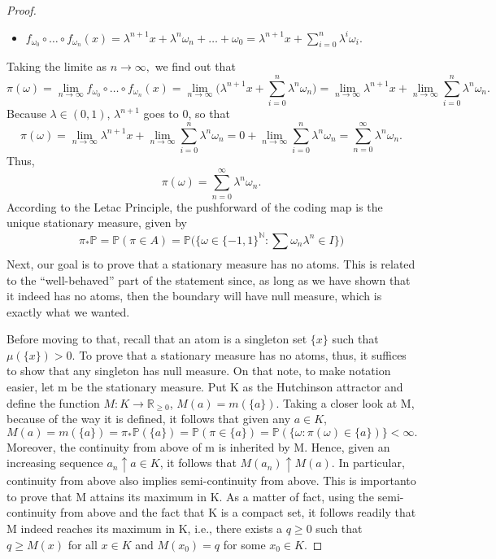 \documentclass[a4paper]{article}
\theoremstyle{plain}
\theoremstyle{definition}
\begin{document}
\begin{proof}
\begin{itemize}
  \item \(f_{\omega_{0}}\circ{\dotsc}\circ{f_{\omega_{n}}}(x) = \lambda^{n+1}x + \lambda^{n}\omega_{n} + \dotsc + \omega_{0} = \lambda^{n+1}x + \sum\limits_{i=0}^{n}\lambda^{i}\omega_{i}.\)
\end{itemize}
Taking the limite as \(n\rightarrow \infty,\) we find out that 
  \[
    \pi(\omega) = \lim_{n\to \infty}f_{\omega_{0}}\circ{\dotsc}\circ{f_{\omega_{n}}}(x) = \lim_{n\to \infty} \biggl(\lambda^{n+1}x + \sum\limits_{i=0}^{n}\lambda^{n}\omega_{n}\biggr) = \lim_{n\to \infty}\lambda^{n+1}x + \lim_{n\to \infty}\sum\limits_{i=0}^{n}\lambda^{n}\omega_{n}.
  \] 
Because \(\lambda\in(0, 1)\), \(\lambda^{n+1}\) goes to 0, so that 
  \[
    \pi(\omega) = \lim_{n\to \infty}\lambda^{n+1}x + \lim_{n\to \infty}\sum\limits_{i=0}^{n}\lambda^{n}\omega_{n} = 0 + \lim_{n\to \infty}\sum\limits_{i=0}^{n}\lambda^{n}\omega_{n} = \sum\limits_{n=0}^{\infty}\lambda^{n}\omega_{n}.
  \]
  Thus, 
  \[
    \pi (\omega ) = \sum\limits_{n=0}^{\infty}\lambda^{n}\omega_{n}.
  \]
  According to the Letac Principle, the pushforward of the coding map is the unique stationary measure, given by 
  \[
    \pi_{*}\mathbb{P} = \mathbb{P}(\pi \in A) = \mathbb{P}\biggl(\biggl\{\omega \in \{-1, 1\}^{\mathbb{N}}: \sum\limits_{}^{}\omega_{n}\lambda^{n}\in I\biggr\}\biggr)
  \]
  Next, our goal is to prove that a stationary measure has no atoms. This is related to the ``well-behaved'' part
of the statement since, as long as we have shown that it indeed has no atoms, then the boundary will have null measure,
which is exactly what we wanted.

  Before moving to that, recall that an atom is a singleton set \(\{x\}\) such that \(\mu(\{x\}) > 0\).
To prove that a stationary measure has no atoms, thus, it suffices to show that any singleton has null measure.
On that note, to make notation easier, let m be the stationary measure. Put K as the Hutchinson attractor and define
the function \(M:K\rightarrow \mathbb{R}_{\geq 0}\), \(M(a)=m(\{a\})\). Taking a closer look at M, because of the way it
is defined, it follows that given any \(a\in K\),
  \[
    M(a) = m(\{a\}) = \pi_{*}\mathbb{P}(\{a\}) = \mathbb{P}(\pi\in \{a\}) = \mathbb{P}(\{\omega: \pi(\omega)\in \{a\})\} < \infty.
  \]
  Moreover, the continuity from above of m is inherited by M. Hence, given an increasing sequence \(a_{n}\uparrow a\in K\),
it follows that \(M(a_{n})\uparrow M(a).\) In particular, continuity from above also implies semi-continuity from above. This is importanto
to prove that M attains its maximum in K. As a matter of fact, using the semi-continuity from above and the fact
that K is a compact set, it follows readily that M indeed reaches its maximum in K, i.e., there exists a \(q\geq 0\) such that
 \(q\geq M(x)\) for all \(x\in K\) and \(M(x_{0}) = q\) for some \(x_{0}\in K\).


\end{proof}
\end{document}
